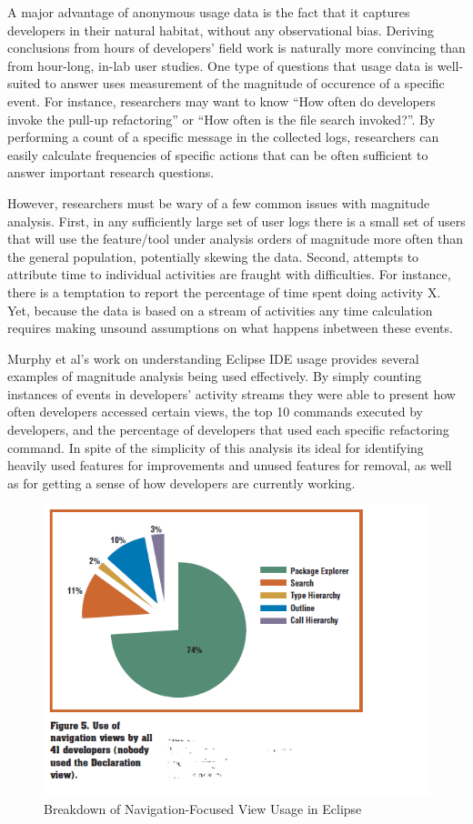 A major advantage of anonymous usage data is the fact that it captures developers in their natural habitat, without any observational bias. Deriving conclusions from hours of developers' field work is naturally more convincing than from hour-long, in-lab user studies. One type of questions that usage data is well-suited to answer uses measurement of the magnitude of occurence of a specific event. For instance, researchers may want to know ``How often do developers invoke the pull-up refactoring'' or ``How often is the file search invoked?''. By performing a count of a specific message in the collected logs, researchers can easily calculate frequencies of specific actions that can be often sufficient to answer important research questions. 

However, researchers must be wary of a few common issues with magnitude analysis. First, in any sufficiently large set of user logs there is a small set of users that will use the feature/tool under analysis orders of magnitude more often than the general population, potentially skewing the data. 
Second, attempts to attribute time to individual activities are fraught with difficulties. For instance, there is a temptation to report the percentage of time spent doing activity X. Yet, because the data is based on a stream of activities any time calculation requires making unsound assumptions on what happens inbetween these events.

Murphy et al's work on understanding Eclipse IDE usage provides several examples of magnitude analysis being used effectively. By simply counting instances of events in developers' activity streams they were able to present how often developers accessed certain views, the top 10 commands executed by developers, and the percentage of developers that used each specific refactoring command. In spite of the simplicity of this analysis its ideal for identifying heavily used features for improvements and unused features for removal, as well as for getting a sense of how developers are currently working. 


\begin{figure}
  \centering
  \includegraphics{AnalyzingUsageData/eclipse}
  \caption{Breakdown of Navigation-Focused View Usage in Eclipse}\label{fig:eclipse}
\end{figure}


